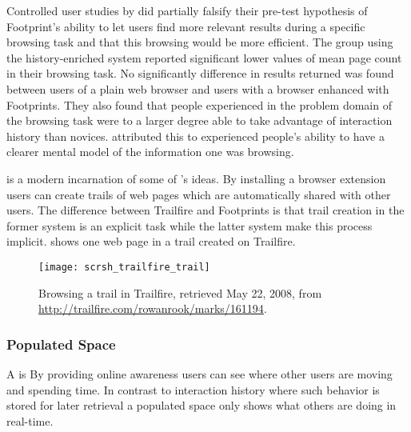 Controlled user studies by \citeauthor{wexelblat99} did partially falsify
their pre-test hypothesis of Footprint's ability to let users find more
relevant results during a specific browsing task and that this browsing
would be more efficient. The group using the history-enriched system reported
significant lower values of mean page count in their browsing task. No
significantly difference in results returned was found between users of a
plain web browser and users with a browser enhanced with Footprints. They also
found that people experienced in the problem domain of the browsing task were
to a larger degree able to take advantage of interaction history than novices.
\citeauthor{wexelblat99} attributed this to experienced people's ability to
have a clearer mental model of the information one was browsing.

%
is a modern incarnation of some of \citeauthor{bush45}'s ideas.
By installing a browser extension users can
create trails of web pages which are automatically shared with other users.
The difference between Trailfire and Footprints is that trail creation in the
former system is an explicit task while the latter system make this process
implicit.  shows one web page in a trail
created on Trailfire.

\begin{figure}
  \begin{whole}
    \centering
    \texttt{[image: scrsh\_trailfire\_trail]}
    \caption[Trailfire Trail]{
      Browsing a trail in Trailfire,
      retrieved May 22, 2008, from
      \url{http://trailfire.com/rowanrook/marks/161194}.
    }
    \label{figure:scrsh.trailfire.trail}
  \end{whole}
\end{figure}

\subsubsection{Populated Space}

A  is
By providing online awareness users can see where other users are moving and
spending time. In contrast to interaction history where such behavior is
stored for later retrieval a populated space only shows what others are doing
in real-time.

